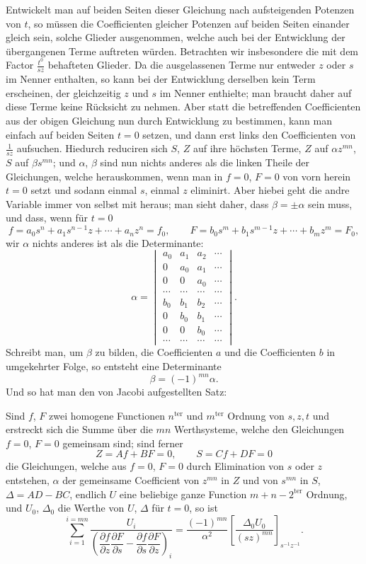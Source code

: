 \documentclass[10pt]{article}
\begin{document}
Entwickelt man auf beiden Seiten dieser Gleichung nach aufsteigenden Potenzen von $t$, so müssen die Coefficienten gleicher Potenzen auf beiden Seiten einander gleich sein, solche Glieder ausgenommen, welche auch bei der Entwicklung der übergangenen Terme auftreten würden. Betrachten wir insbesondere die mit dem Factor $\frac{t^0}{sz}$ behafteten Glieder. Da die ausgelassenen Terme nur entweder $z$ oder $s$ im Nenner enthalten, so kann bei der Entwicklung derselben kein Term erscheinen, der gleichzeitig $z$ und $s$ im Nenner enthielte; man braucht daher auf diese Terme keine Rücksicht zu nehmen. Aber statt die betreffenden Coefficienten aus der obigen Gleichung nun durch Entwicklung zu bestimmen, kann man einfach auf beiden Seiten $t=0$ setzen, und dann erst links den Coefficienten von $\frac{1}{sz}$ aufsuchen. Hiedurch reduciren sich $S$, $Z$ auf ihre höchsten Terme, $Z$ auf $\alpha z^{mn}$, $S$ auf $\beta s^{mn}$; und $\alpha$, $\beta$ sind nun nichts anderes als die linken Theile der Gleichungen, welche herauskommen, wenn man in $f=0$, $F=0$ von vorn herein $t=0$ setzt und sodann einmal $s$, einmal $z$ eliminirt. Aber hiebei geht die andre Variable immer von selbst mit heraus; man sieht daher, dass $\beta=\pm\alpha$ sein muss, und dass, wenn für $t=0$
\[
f=a_0s^n+a_1s^{n-1}z+\cdots+a_nz^n=f_0,
\qquad
F=b_0s^m+b_1s^{m-1}z+\cdots+b_mz^m=F_0,
\]
wir $\alpha$ nichts anderes ist als die Determinante:
\[
\alpha=\begin{vmatrix}
a_0&a_1&a_2&\cdots\\
0&a_0&a_1&\cdots\\
0&0&a_0&\cdots\\
\cdots&\cdots&\cdots&\cdots\\
b_0&b_1&b_2&\cdots\\
0&b_0&b_1&\cdots\\
0&0&b_0&\cdots\\
\cdots&\cdots&\cdots&\cdots
\end{vmatrix}.
\]
Schreibt man, um $\beta$ zu bilden, die Coefficienten $a$ und die Coefficienten $b$ in umgekehrter Folge, so entsteht eine Determinante
\[
\beta=(-1)^{mn}\alpha.
\]
Und so hat man den von Jacobi aufgestellten Satz:

Sind $f$, $F$ zwei homogene Functionen $n^{\text{ter}}$ und $m^{\text{ter}}$ Ordnung von $s,z,t$ und erstreckt sich die Summe über die $mn$ Werthsysteme, welche den Gleichungen $f=0$, $F=0$ gemeinsam sind; sind ferner
\[
Z=Af+BF=0,
\qquad
S=Cf+DF=0
\]
die Gleichungen, welche aus $f=0$, $F=0$ durch Elimination von $s$ oder $z$ entstehen, $\alpha$ der gemeinsame Coefficient von $z^{mn}$ in $Z$ und von $s^{mn}$ in $S$, $\Delta=AD-BC$, endlich $U$ eine beliebige ganze Function $m+n-2^{\text{ter}}$ Ordnung, und $U_0$, $\Delta_0$ die Werthe von $U$, $\Delta$ für $t=0$, so ist
\[
\sum_{i=1}^{i=mn}
\frac{U_i}{\left(\dfrac{\partial f}{\partial z}\dfrac{\partial F}{\partial s}-\dfrac{\partial f}{\partial s}\dfrac{\partial F}{\partial z}\right)_i}
=\frac{(-1)^{mn}}{\alpha^2}\left[\frac{\Delta_0U_0}{(sz)^{mn}}\right]_{s^{-1}z^{-1}}.
\]
\end{document}
